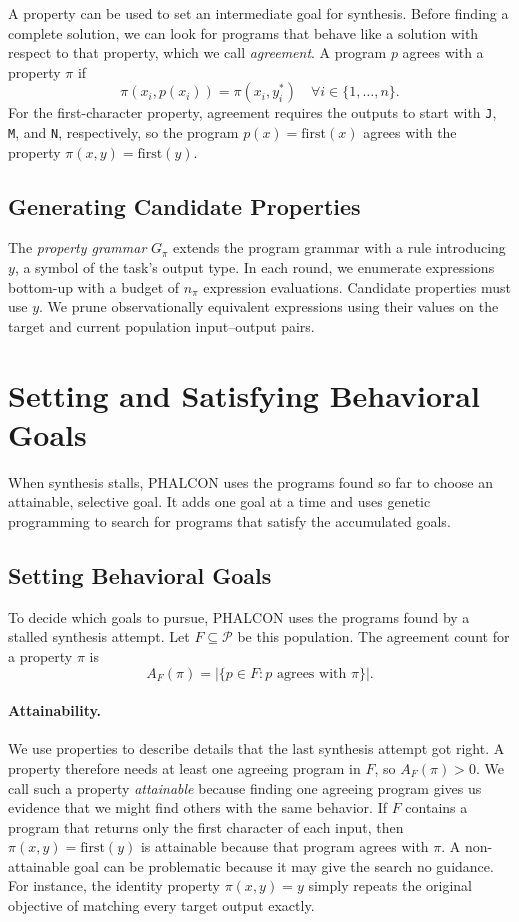 \documentclass[letterpaper]{article} %
\begin{document}
A property can be used to set an intermediate goal for synthesis.
Before finding a complete solution, we can look for programs that
behave like a solution with respect to that property, which we call
\emph{agreement}. A program \(p\) agrees with a property \(\pi\) if
\[
  \pi(x_i,p(x_i))=\pi(x_i,y_i^*) \quad \forall i\in\{1,\ldots,n\}.
\]
For the first-character property, agreement requires the outputs to
start with \texttt{J}, \texttt{M}, and \texttt{N}, respectively,
so the program \(p(x)=\mathrm{first}(x)\) agrees with the property
\(\pi(x,y)=\mathrm{first}(y)\).

\subsection{Generating Candidate Properties}
The \emph{property grammar} \(G_\pi\) extends the program grammar
with a rule introducing \(y\), a symbol of the task's output type.
In each round, we enumerate expressions bottom-up with a budget of
\(n_\pi\) expression evaluations. Candidate properties must use \(y\).
We prune observationally equivalent expressions using their values
on the target and current population input--output pairs.

\section{Setting and Satisfying Behavioral Goals}
When synthesis stalls, PHALCON uses the programs found so far to
choose an attainable, selective goal. It adds one goal at a time and
uses genetic programming to search for programs that satisfy the
accumulated goals.

\subsection{Setting Behavioral Goals}
To decide which goals to pursue, PHALCON uses the programs found
by a stalled synthesis attempt. Let \(F\subseteq\mathcal{P}\) be
this population. The agreement count for a property \(\pi\) is
\[
  A_F(\pi)=\bigl|\{p\in F : p\mbox{ agrees with }\pi\}\bigr|.
\]

\paragraph{Attainability.}
We use properties to describe details that the last synthesis attempt
got right. A property therefore needs at least one agreeing program
in \(F\), so \(A_F(\pi)>0\). We call such a property
\emph{attainable} because finding one agreeing program gives us
evidence that we might find others with the same behavior. If \(F\)
contains a program that returns only the first character of each
input, then \(\pi(x,y)=\mathrm{first}(y)\) is attainable because
that program agrees with \(\pi\). A non-attainable goal can be
problematic because it may give the search no guidance. For instance,
the identity property \(\pi(x,y)=y\) simply repeats the original
objective of matching every target output exactly.
\end{document}
